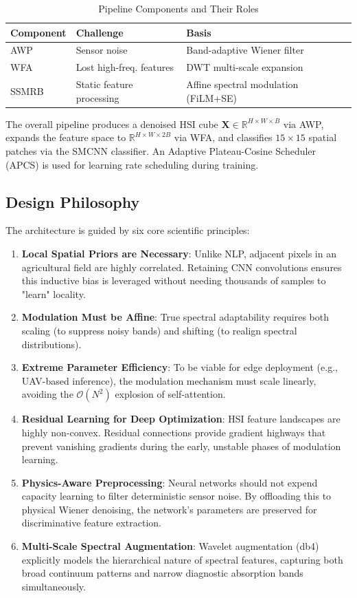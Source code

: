 \documentclass[pdflatex,sn-mathphys-num]{sn-jnl}
\theoremstyle{thmstyleone}
\theoremstyle{thmstyletwo}
\theoremstyle{thmstylethree}
\begin{document}
\begin{table}[!t]
\caption{Pipeline Components and Their Roles}
\label{tab:components}
\centering
\begin{tabular}{lll}
\toprule
\textbf{Component} & \textbf{Challenge} & \textbf{Basis} \\
\midrule
AWP & Sensor noise & Band-adaptive Wiener filter \\
WFA & Lost high-freq. features & DWT multi-scale expansion \\
SSMRB & Static feature processing & Affine spectral modulation (FiLM+SE) \\
\bottomrule
\end{tabular}
\end{table}

The overall pipeline produces a denoised HSI cube $\mathbf{X} \in \mathbb{R}^{H \times W \times B}$ via AWP, expands the feature space to $\mathbb{R}^{H \times W \times 2B}$ via WFA, and classifies $15 \times 15$ spatial patches via the SMCNN classifier. An Adaptive Plateau-Cosine Scheduler (APCS) is used for learning rate scheduling during training.

\subsection{Design Philosophy}
The architecture is guided by six core scientific principles:
\begin{enumerate}
 \item \textbf{Local Spatial Priors are Necessary}: Unlike NLP, adjacent pixels in an agricultural field are highly correlated. Retaining CNN convolutions ensures this inductive bias is leveraged without needing thousands of samples to "learn" locality.
 \item \textbf{Modulation Must be Affine}: True spectral adaptability requires both scaling (to suppress noisy bands) and shifting (to realign spectral distributions).
 \item \textbf{Extreme Parameter Efficiency}: To be viable for edge deployment (e.g., UAV-based inference), the modulation mechanism must scale linearly, avoiding the $\mathcal{O}(N^2)$ explosion of self-attention.
    \item \textbf{Residual Learning for Deep Optimization}: HSI feature landscapes are highly non-convex. Residual connections provide gradient highways that prevent vanishing gradients during the early, unstable phases of modulation learning.
    \item \textbf{Physics-Aware Preprocessing}: Neural networks should not expend capacity learning to filter deterministic sensor noise. By offloading this to physical Wiener denoising, the network's parameters are preserved for discriminative feature extraction.
    \item \textbf{Multi-Scale Spectral Augmentation}: Wavelet augmentation (db4) explicitly models the hierarchical nature of spectral features, capturing both broad continuum patterns and narrow diagnostic absorption bands simultaneously.
     \end{enumerate}
\end{document}

